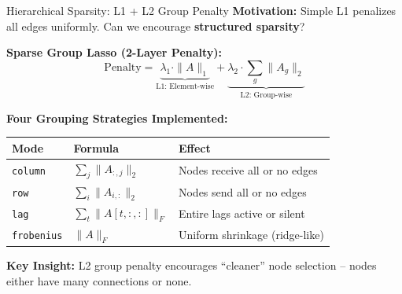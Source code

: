 \documentclass[aspectratio=169]{beamer}
\begin{document}
\begin{frame}{Hierarchical Sparsity: L1 + L2 Group Penalty}
\textbf{Motivation:} Simple L1 penalizes all edges uniformly. Can we encourage \textbf{structured sparsity}?

\vspace{0.1cm}
\textbf{Sparse Group Lasso (2-Layer Penalty):}
\begin{equation*}
\text{Penalty} = \underbrace{\lambda_1 \cdot \|A\|_1}_{\text{L1: Element-wise}} + \underbrace{\lambda_2 \cdot \sum_g \|A_g\|_2}_{\text{L2: Group-wise}}
\end{equation*}

\vspace{0.1cm}
\textbf{Four Grouping Strategies Implemented:}
\begin{table}
\centering
\small
\begin{tabular}{l|l|l}
\toprule
\textbf{Mode} & \textbf{Formula} & \textbf{Effect} \\
\midrule
\texttt{column} & $\sum_j \|A_{:,j}\|_2$ & Nodes receive all or no edges \\
\texttt{row} & $\sum_i \|A_{i,:}\|_2$ & Nodes send all or no edges \\
\texttt{lag} & $\sum_t \|A[t,:,:]\|_F$ & Entire lags active or silent \\
\texttt{frobenius} & $\|A\|_F$ & Uniform shrinkage (ridge-like) \\
\bottomrule
\end{tabular}
\end{table}

\vspace{0.1cm}
\textbf{Key Insight:} L2 group penalty encourages ``cleaner'' node selection -- nodes either have many connections or none.
\end{frame}
\end{document}
